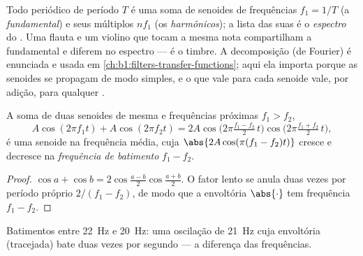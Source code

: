 \begin{remark}[Espectro]\label{rem:b1:wave-propagation:spectrum}
Todo  periódico de período $T$ é uma soma de senoides de frequências
$f_1 = 1/T$ (a \emph{fundamental}) e seus múltiplos $nf_1$ (os
\emph{harmônicos}); a lista das suas  é o \emph{espectro} do
. Uma flauta e um violino que tocam a mesma nota compartilham a
fundamental e diferem no espectro --- é o timbre. A
decomposição (de Fourier) é enunciada e usada em
\cref{ch:b1:filters-transfer-functions}; aqui ela importa porque
as senoides se propagam de modo simples, e o que vale para cada senoide vale,
por adição, para qualquer .
\end{remark}

\begin{proposition}[Batimentos]\label{prop:b1:wave-propagation:beats}
A soma de duas senoides de mesma  e frequências próximas
$f_1 > f_2$,
\[
A\cos(2\pi f_1 t) + A\cos(2\pi f_2 t)
= 2A\cos\!\big(2\pi\tfrac{f_1 - f_2}{2}\,t\big)\cos\!\big(2\pi\tfrac{f_1 + f_2}{2}\,t\big),
\]
é uma senoide na frequência média, cuja 
$\abs{2A\cos(\pi(f_1 - f_2)t)}$ cresce e decresce na \emph{frequência de
batimento} $f_1 - f_2$.
\end{proposition}

\begin{proof}
$\cos a + \cos b = 2\cos\frac{a - b}{2}\cos\frac{a + b}{2}$. O fator
lento se anula duas vezes por período próprio $2/(f_1 - f_2)$, de modo que a
envoltória $\abs{\cdot}$ tem frequência $f_1 - f_2$.
\end{proof}

\begin{omfigure}

{\small Batimentos entre \qty{22}{Hz} e \qty{20}{Hz}: uma oscilação de
\qty{21}{Hz} cuja envoltória (tracejada) bate duas vezes por segundo --- a
diferença das frequências.}
\end{omfigure}


